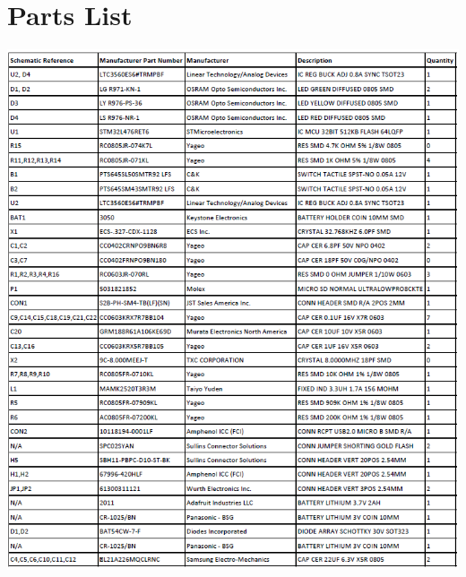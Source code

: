 \documentclass[11pt]{article}
\begin{document}
\section{Parts List}

\includegraphics[width=\textwidth]{Figures/appendix/parts_list_3_1_2019_roughdraft.PNG}





%
\end{document}
